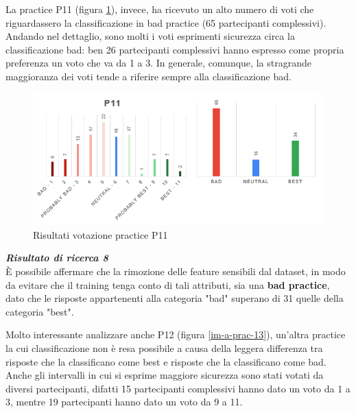 La practice P11 (figura \ref{im-a-prac-12}), invece, ha ricevuto un alto numero di voti che riguardassero la classificazione in bad practice (65 partecipanti complessivi). Andando nel dettaglio, sono molti i voti esprimenti sicurezza circa la classificazione bad: ben 26 partecipanti complessivi hanno espresso come propria preferenza un voto che va da 1 a 3. In generale, comunque, la stragrande maggioranza dei voti tende a riferire sempre alla classificazione bad.

\begin{figure}[h!]
    \centering
    \includegraphics[width=1\textwidth]{figure/data-analysis3/P11.png}
    \caption{Risultati votazione practice P11}
    \label{im-a-prac-12}
\end{figure}

\begin{center}
    \begin{tcolorbox}[width=400pt, colframe=black, colback=Gray!30]
		\begin{minipage}{\textwidth}
			\textit{\faKey \textbf{ Risultato di ricerca 8}}\\
			È possibile affermare che la rimozione delle feature sensibili dal dataset, in modo da evitare che il training tenga conto di tali attributi, sia una \textbf{bad practice}, dato che le risposte appartenenti alla categoria "bad" superano di 31 quelle della categoria "best".
		\end{minipage}
	\end{tcolorbox}
\end{center}

Molto interessante analizzare anche P12 (figura \ref{im-a-prac-13}), un'altra practice la cui classificazione non è resa possibile a causa della leggera differenza tra risposte che la classificano come best e risposte che la classificano come bad. Anche gli intervalli in cui si esprime maggiore sicurezza sono stati votati da diversi partecipanti, difatti 15 partecipanti complessivi hanno dato un voto da 1 a 3, mentre 19 partecipanti hanno dato un voto da 9 a 11.


